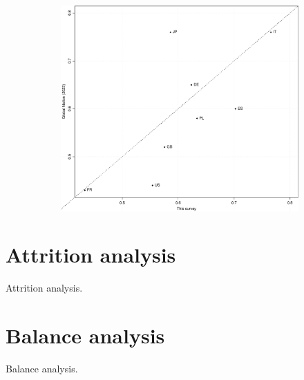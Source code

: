 \begin{figure}[h!]
\begin{subfigure}{.45\textwidth}
  \includegraphics[width=\textwidth]{../figures/all/my_tax_global_nation_comparison.pdf}%
\end{subfigure}
\end{figure}

\clearpage
\section{Attrition analysis}\label{app:attrition}

\begin{table}[h!]
    \caption[Attrition analysis]{Attrition analysis.} \label{tab:attrition}
    \makebox[\textwidth][c]{\resizebox*{!}{.87\textheight}{ %
        }}
\end{table}

\clearpage
\section{Balance analysis}\label{app:balance}

\begin{table}[h]
    \caption[Balance analysis]{Balance analysis.} \label{tab:balance}
    \makebox[\textwidth][c]{
\resizebox*{!}{.71\textheight}{ 
        
        }
    }
\end{table}
\clearpage

